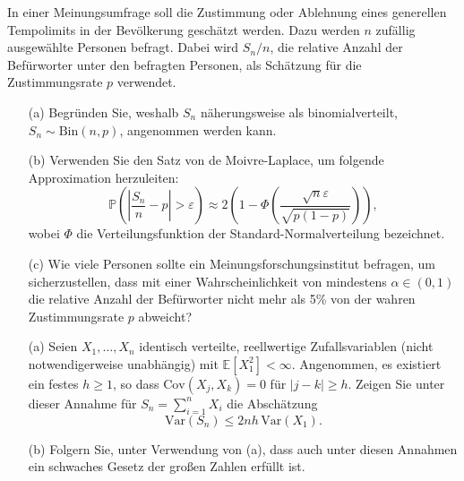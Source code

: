 \begin{Problem}
	In einer Meinungsumfrage soll die Zustimmung oder Ablehnung eines generellen Tempolimits in der Bevölkerung geschätzt werden. Dazu werden \( n \) zufällig ausgewählte Personen befragt. Dabei wird \( S_n/n \), die relative Anzahl der Befürworter unter den befragten Personen, als Schätzung für die Zustimmungsrate \( p \) verwendet.
	
	\begin{enumerate}
		\item[(a)] Begründen Sie, weshalb \( S_n \) näherungsweise als binomialverteilt, \( S_n \sim \text{Bin}(n,p) \), angenommen werden kann.
		
		\item[(b)] Verwenden Sie den Satz von de Moivre-Laplace, um folgende Approximation herzuleiten:
		\[
		\mathbb{P} \left( \left| \frac{S_n}{n} - p \right| > \varepsilon \right) \approx 2 \left( 1 - \Phi \left( \frac{\sqrt{n} \varepsilon}{\sqrt{p(1 - p)}} \right) \right),
		\]
		wobei \( \Phi \) die Verteilungsfunktion der Standard-Normalverteilung bezeichnet.
		
		\item[(c)] Wie viele Personen sollte ein Meinungsforschungsinstitut befragen, um sicherzustellen, dass mit einer Wahrscheinlichkeit von mindestens \( \alpha \in (0,1) \) die relative Anzahl der Befürworter nicht mehr als 5\% von der wahren Zustimmungsrate \( p \) abweicht?
	\end{enumerate}
\end{Problem}

\begin{Problem}
	\begin{enumerate}
		\item[(a)] Seien \( X_1, \dots, X_n \) identisch verteilte, reellwertige Zufallsvariablen (nicht notwendigerweise unabhängig) mit \( \mathbb{E}[X_1^2] < \infty \). Angenommen, es existiert ein festes \( h \geq 1 \), so dass \(\text{Cov}(X_j, X_k) = 0\) für \( |j - k| \geq h \). Zeigen Sie unter dieser Annahme für \( S_n = \sum_{i=1}^{n} X_i \) die Abschätzung
		\[
		\text{Var}(S_n) \leq 2nh \, \text{Var}(X_1).
		\]
		
		\item[(b)] Folgern Sie, unter Verwendung von (a), dass auch unter diesen Annahmen ein schwaches Gesetz der großen Zahlen erfüllt ist.
	\end{enumerate}
	
\end{Problem}